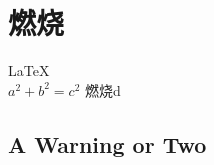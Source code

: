\documentclass[UTF8]{article}
\begin{document}
       
 
\section{燃烧}          
\LaTeX \,\\ 
 $a^2+b^2=c^2$
 燃烧d
\subsection{A Warning or Two}  

\end{document}
